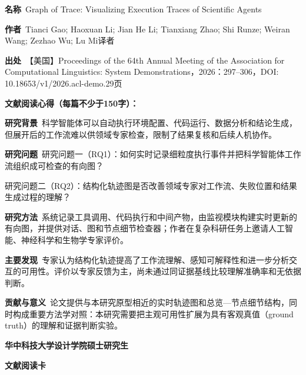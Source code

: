 \vspace{0.25em}
\noindent\underline{}\par
\vspace{0.35em}
\noindent\textbf{名称}\ Graph of Trace: Visualizing Execution Traces of Scientific Agents\par
\noindent\textbf{作者}\ Tianci Gao; Haoxuan Li; Jian He Li; Tianxiang Zhao; Shi Runze; Weiran Wang; Zezhao Wu; Lu Mi\quad 译者\par
\noindent\textbf{出处}\ 【美国】Proceedings of the 64th Annual Meeting of the Association for Computational Linguistics: System Demonstrations，2026：297–306，DOI: 10.18653/v1/2026.acl-demo.29\quad 页\par
\vspace{0.35em}
\noindent\textbf{文献阅读心得（每篇不少于150字）：}\par
\noindent\textbf{研究背景}\ 科学智能体可以自动执行环境配置、代码运行、数据分析和结论生成，但展开后的工作流难以供领域专家检查，限制了结果复核和后续人机协作。\par
\noindent\textbf{研究问题}\ 研究问题一（RQ1）：如何实时记录细粒度执行事件并把科学智能体工作流组织成可检查的有向图？\par
研究问题二（RQ2）：结构化轨迹图是否改善领域专家对工作流、失败位置和结果生成过程的理解？\par
\noindent\textbf{研究方法}\ 系统记录工具调用、代码执行和中间产物，由监视模块构建实时更新的有向图，并提供对话、图和节点细节检查器；作者在复杂科研任务上邀请人工智能、神经科学和生物学专家评价。\par
\noindent\textbf{主要发现}\ 专家认为结构化轨迹提高了工作流理解、感知可解释性和进一步分析交互的可用性。评价以专家反馈为主，尚未通过同证据基线比较理解准确率和无依据判断。\par
\noindent\textbf{贡献与意义}\ 论文提供与本研究原型相近的实时轨迹图和总览—节点细节结构，同时构成重要方法学对照：本研究需要把主观可用性扩展为具有客观真值（ground truth）的理解和证据判断实验。\par
\clearpage
\begin{center}
{\songti\bfseries\fontsize{18.5pt}{27.75pt}\selectfont 华中科技大学设计学院硕士研究生\par}
{\songti\bfseries\fontsize{18.5pt}{27.75pt}\selectfont 文献阅读卡\par}
\end{center}
\vspace{0.25em}
\noindent\underline{}\par
